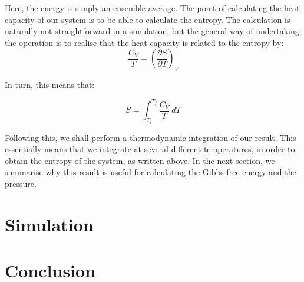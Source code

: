 \documentclass[12pt,a4paper]{report}
\begin{document}
Here, the energy is simply an ensemble average. The point of calculating the heat capacity of our system is to be able to calculate the entropy. The calculation is naturally not straightforward in a simulation, but the general way of undertaking the operation is to realise that the heat capacity is related to the entropy by:
\begin{equation}
\frac{C_V}{T} = \left( \frac{\partial S}{\partial T}\right)_V
\end{equation}

In turn, this means that:

\begin{equation}
S = \int^{T_f}_{T_i} \frac{C_V}{T}\ dT
\end{equation}

Following this, we shall perform a thermodynamic integration of our result. This essentially means that we integrate at several different temperatures, in order to obtain the entropy of the system, as written above. In the next section, we summarise why this result is useful for calculating the Gibbs free energy and the pressure.






\chapter{Simulation}


\chapter{Conclusion}
\end{document}
